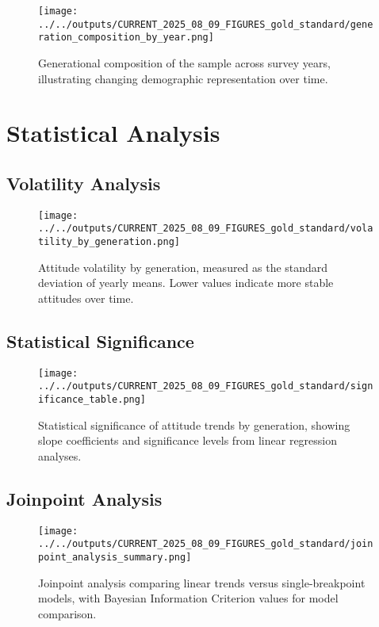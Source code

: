 \documentclass{article}
\begin{document}
\begin{figure}[H]
    \centering
    \texttt{[image: ../../outputs/CURRENT\_2025\_08\_09\_FIGURES\_gold\_standard/generation\_composition\_by\_year.png]}
    \caption{Generational composition of the sample across survey years, illustrating changing demographic representation over time.}
    \label{fig:composition}
\end{figure}

\section{Statistical Analysis}

\subsection{Volatility Analysis}

\begin{figure}[H]
    \centering
    \texttt{[image: ../../outputs/CURRENT\_2025\_08\_09\_FIGURES\_gold\_standard/volatility\_by\_generation.png]}
    \caption{Attitude volatility by generation, measured as the standard deviation of yearly means. Lower values indicate more stable attitudes over time.}
    \label{fig:volatility}
\end{figure}

\subsection{Statistical Significance}

\begin{figure}[H]
    \centering
    \texttt{[image: ../../outputs/CURRENT\_2025\_08\_09\_FIGURES\_gold\_standard/significance\_table.png]}
    \caption{Statistical significance of attitude trends by generation, showing slope coefficients and significance levels from linear regression analyses.}
    \label{fig:significance}
\end{figure}

\subsection{Joinpoint Analysis}

\begin{figure}[H]
    \centering
    \texttt{[image: ../../outputs/CURRENT\_2025\_08\_09\_FIGURES\_gold\_standard/joinpoint\_analysis\_summary.png]}
    \caption{Joinpoint analysis comparing linear trends versus single-breakpoint models, with Bayesian Information Criterion values for model comparison.}
    \label{fig:joinpoint}
\end{figure}
\end{document}
